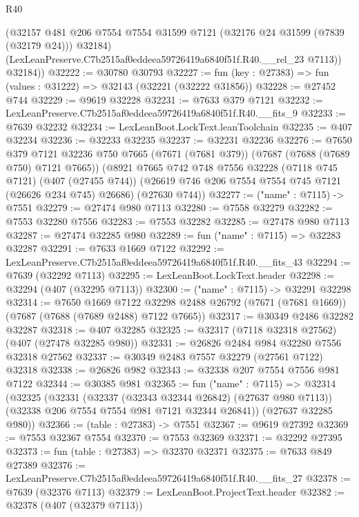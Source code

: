 \begin{lexlean}{R40}
\begin{coremodule}
          (@32157
            @481
            @206
            @7554
            @7554
            @31599
            @7121
            (@32176 @24 @31599 (@7839 (@32179 @24)))
            @32184)
          (LexLeanPreserve.C7b2515af0eddeea59726419a6840f51f.R40.__rel_23 @7113))
        @32184))
@32222 := @30780 @30793
@32227 := fun (key : @27383) => fun (values : @31222) => @32143 (@32221 (@32222 @31856))
@32228 := @27452 @744
@32229 := @9619 @32228
@32231 := @7633 @379 @7121
@32232 := LexLeanPreserve.C7b2515af0eddeea59726419a6840f51f.R40.__fits_9
@32233 := @7639 @32232
@32234 := LexLeanBoot.LockText.leanToolchain
@32235 := @407 @32234
@32236 := @32233 @32235
@32237 := @32231 @32236
@32276 := @7650
    @379
    @7121
    @32236
    @750
    @7665
    (@7671 (@7681 @379))
    (@7687 (@7688 (@7689 @750) @7121 @7665))
    (@8921
      @7665
      @742
      @748
      @7556
      @32228
      (@7118 @745 @7121)
      (@407 (@27455 @744))
      (@26619 @746 @206 @7554 @7554 @745 @7121 (@26626 @234 @745) @26686)
      (@27630 @744))
@32277 := ("name" : @7115) -> @7551
@32279 := @27474 @980 @7113
@32280 := @7558 @32279
@32282 := @7553 @32280 @7556
@32283 := @7553 @32282
@32285 := @27478 @980 @7113
@32287 := @27474 @32285 @980
@32289 := fun ("name" : @7115) => @32283 @32287
@32291 := @7633 @1669 @7122
@32292 := LexLeanPreserve.C7b2515af0eddeea59726419a6840f51f.R40.__fits_43
@32294 := @7639 (@32292 @7113)
@32295 := LexLeanBoot.LockText.header
@32298 := @32294 (@407 (@32295 @7113))
@32300 := ("name" : @7115) -> @32291 @32298
@32314 := @7650
    @1669
    @7122
    @32298
    @2488
    @26792
    (@7671 (@7681 @1669))
    (@7687 (@7688 (@7689 @2488) @7122 @7665))
@32317 := @30349 @2486 @32282 @32287
@32318 := @407 @32285
@32325 := @32317 (@7118 @32318 @27562) (@407 (@27478 @32285 @980))
@32331 := @26826 @2484 @984 @32280 @7556 @32318 @27562
@32337 := @30349 @2483 @7557 @32279 (@27561 @7122) @32318
@32338 := @26826 @982
@32343 := @32338 @207 @7554 @7556 @981 @7122
@32344 := @30385 @981
@32365 := fun ("name" : @7115) =>
  @32314
    (@32325
      (@32331
        (@32337 (@32343 @32344 @26842) (@27637 @980 @7113))
        (@32338 @206 @7554 @7554 @981 @7121 @32344 @26841))
      (@27637 @32285 @980))
@32366 := (table : @27383) -> @7551
@32367 := @9619 @27392
@32369 := @7553 @32367 @7554
@32370 := @7553 @32369
@32371 := @32292 @27395
@32373 := fun (table : @27383) => @32370 @32371
@32375 := @7633 @849 @27389
@32376 := LexLeanPreserve.C7b2515af0eddeea59726419a6840f51f.R40.__fits_27
@32378 := @7639 (@32376 @7113)
@32379 := LexLeanBoot.ProjectText.header
@32382 := @32378 (@407 (@32379 @7113))

\end{coremodule}
\end{lexlean}
